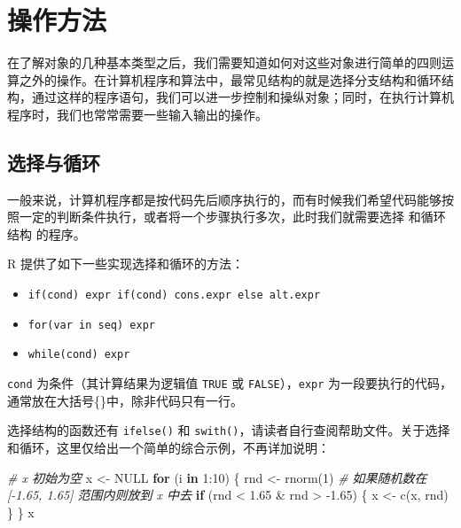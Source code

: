 \documentclass[
  b5paper,
  UTF8,twoside]{book}
\newenvironment{Shaded}{\begin{snugshade}}{\end{snugshade}}
\newcommand{\CommentTok}[1]{\textcolor[rgb]{0.56,0.35,0.01}{\textit{#1}}}
\newcommand{\ConstantTok}[1]{\textcolor[rgb]{0.00,0.00,0.00}{#1}}
\newcommand{\ControlFlowTok}[1]{\textcolor[rgb]{0.13,0.29,0.53}{\textbf{#1}}}
\newcommand{\DecValTok}[1]{\textcolor[rgb]{0.00,0.00,0.81}{#1}}
\newcommand{\FloatTok}[1]{\textcolor[rgb]{0.00,0.00,0.81}{#1}}
\newcommand{\FunctionTok}[1]{\textcolor[rgb]{0.00,0.00,0.00}{#1}}
\newcommand{\NormalTok}[1]{#1}
\newcommand{\OtherTok}[1]{\textcolor[rgb]{0.56,0.35,0.01}{#1}}
\newcommand{\SpecialCharTok}[1]{\textcolor[rgb]{0.00,0.00,0.00}{#1}}
\providecommand{\tightlist}{%
  \setlength{\itemsep}{0pt}\setlength{\parskip}{0pt}}
\begin{document}
\hypertarget{ux64cdux4f5cux65b9ux6cd5}{%
\section{操作方法}\label{ux64cdux4f5cux65b9ux6cd5}}

在了解对象的几种基本类型之后，我们需要知道如何对这些对象进行简单的四则运算之外的操作。在计算机程序和算法中，最常见结构的就是选择分支结构和循环结构，通过这样的程序语句，我们可以进一步控制和操纵对象；同时，在执行计算机程序时，我们也常常需要一些输入输出的操作。

\hypertarget{ux9009ux62e9ux4e0eux5faaux73af}{%
\subsection{选择与循环}\label{ux9009ux62e9ux4e0eux5faaux73af}}

一般来说，计算机程序都是按代码先后顺序执行的，而有时候我们希望代码能够按照一定的判断条件执行，或者将一个步骤执行多次，此时我们就需要选择 和循环结构 的程序。

R 提供了如下一些实现选择和循环的方法：

\begin{itemize}
\tightlist
\item
  \texttt{if(cond)\ expr\ if(cond)\ cons.expr\ else\ alt.expr}
\item
  \texttt{for(var\ in\ seq)\ expr}
\item
  \texttt{while(cond)\ expr}
\end{itemize}

\texttt{cond} 为条件（其计算结果为逻辑值 \texttt{TRUE} 或 \texttt{FALSE}），\texttt{expr} 为一段要执行的代码，通常放在大括号\{\}中，除非代码只有一行。

选择结构的函数还有 \texttt{ifelse()} 和 \texttt{swith()}，请读者自行查阅帮助文件。关于选择和循环，这里仅给出一个简单的综合示例，不再详加说明：

\begin{Shaded}
\begin{Highlighting}[]
\CommentTok{\# x 初始为空}
\NormalTok{x }\OtherTok{\textless{}{-}} \ConstantTok{NULL}
\ControlFlowTok{for}\NormalTok{ (i }\ControlFlowTok{in} \DecValTok{1}\SpecialCharTok{:}\DecValTok{10}\NormalTok{) \{}
\NormalTok{  rnd }\OtherTok{\textless{}{-}} \FunctionTok{rnorm}\NormalTok{(}\DecValTok{1}\NormalTok{)}
  \CommentTok{\# 如果随机数在 [{-}1.65, 1.65] 范围内则放到 x 中去}
  \ControlFlowTok{if}\NormalTok{ (rnd }\SpecialCharTok{\textless{}} \FloatTok{1.65} \SpecialCharTok{\&}\NormalTok{ rnd }\SpecialCharTok{\textgreater{}} \SpecialCharTok{{-}}\FloatTok{1.65}\NormalTok{) \{}
\NormalTok{    x }\OtherTok{\textless{}{-}} \FunctionTok{c}\NormalTok{(x, rnd)}
\NormalTok{  \}}
\NormalTok{\}}
\NormalTok{x}
\end{Highlighting}
\end{Shaded}
\end{document}
